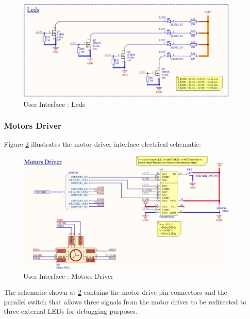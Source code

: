 \documentclass[report.tex]{subfiles}
\begin{document}
\begin{figure}[H]
	\centering
	\includegraphics[width=1\textwidth]{Include/Figure/Hardware/LTEWatch_LTEW_User_Interface_Leds}
	\caption{User Interface : Leds}
	\label{fig:LTEWatch_LTEW_User_Interface_Leds}
\end{figure}



\subsubsection{Motors Driver}

Figure \ref{fig:LTEWatch_LTEW_User_Interface_Motors_Driver} illustrates the motor driver interface electrical schematic:

\begin{figure}[H]
	\centering
	\includegraphics[width=1\textwidth]{Include/Figure/Hardware/LTEWatch_LTEW_User_Interface_Motors_Driver}
	\caption{User Interface : Motors Driver}
	\label{fig:LTEWatch_LTEW_User_Interface_Motors_Driver}
\end{figure}

The schematic shown at \ref{fig:LTEWatch_LTEW_User_Interface_Motors_Driver} contains the motor drive pin connectors and the parallel switch that allows three signals from the motor driver to be redirected to three external LEDs for debugging purposes.
\end{document}

